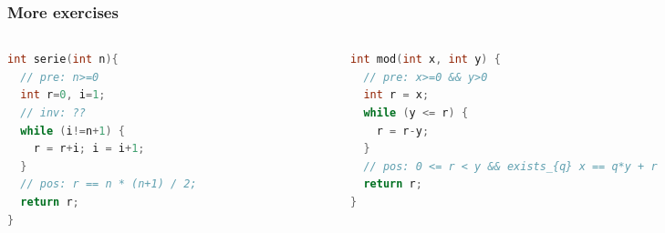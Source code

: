 \documentclass[aspectratio=169]{beamer}
\begin{document}
\begin{frame}[fragile]
\begin{columns}
\pause
{}
\end{columns}
\end{frame}


\begin{frame}[fragile]\frametitle{More exercises}
\begin{columns}
\begin{column}{0.48\textwidth}
\begin{lstlisting}[language=C++]
int serie(int n){
  // pre: n>=0
  int r=0, i=1;
  // inv: ??
  while (i!=n+1) {
    r = r+i; i = i+1;
  }
  // pos: r == n * (n+1) / 2;
  return r;
}
\end{lstlisting}
\end{column}
\begin{column}{0.48\textwidth}
\begin{lstlisting}[language=C++]
int mod(int x, int y) {
  // pre: x>=0 && y>0
  int r = x;
  while (y <= r) {
    r = r-y;
  }
  // pos: 0 <= r < y && exists_{q} x == q*y + r
  return r;
}
\end{lstlisting}
\end{column}
\end{columns}

\end{frame}
\end{document}

